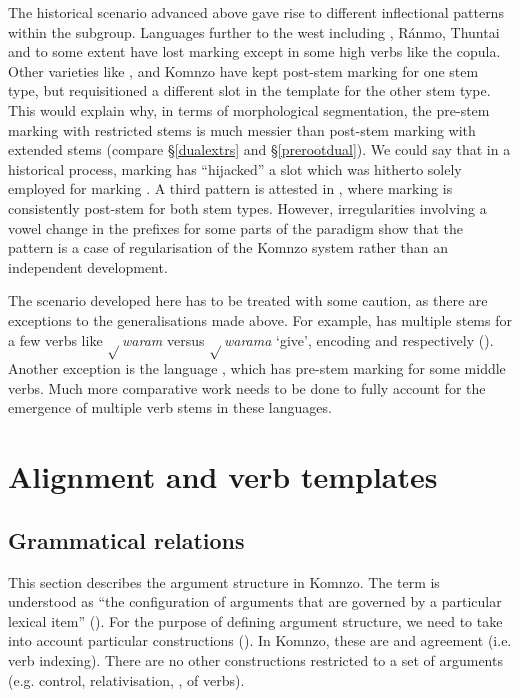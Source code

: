 The historical scenario advanced above gave rise to different inflectional patterns within the  subgroup. Languages further to the west including , Ránmo,  Thuntai and to some extent  have lost  marking except in some high  verbs like the copula. Other varieties like ,  and Komnzo have kept post-stem  marking for one stem type, but requisitioned a different slot in the template for the other stem type. This would explain why, in terms of morphological segmentation, the pre-stem  marking with restricted stems is much messier than post-stem  marking with extended stems (compare \S{}\ref{dualextrs} and \S{}\ref{prerootdual}). We could say that in a historical process,  marking has ``hijacked'' a slot which was hitherto solely employed for marking . A third pattern is attested in , where  marking is consistently post-stem for both stem types. However, irregularities involving a vowel change in the prefixes for some parts of the paradigm show that the  pattern is a case of regularisation of the Komnzo system rather than an independent development.%

The scenario developed here has to be treated with some caution, as there are exceptions to the generalisations made above. For example,  has multiple stems for a few verbs like $\sqrt{}$\emph{waram} versus $\sqrt{}$\emph{warama} `give', encoding  and   respectively (\citealt{Evans:nen}). Another exception is the  language , which has pre-stem  marking for some middle verbs. Much more comparative work needs to be done to fully account for the emergence of multiple verb stems in these languages.

\section{Alignment and verb templates} \label{alignmtemplates}

\subsection{Grammatical relations} \label{grammrel}

This section describes the argument structure in Komnzo. The term is understood as ``the configuration of arguments that are governed by a particular lexical item'' (\citealt[1130]{HaspelmathBardey:2004}). For the purpose of defining argument structure, we need to take into account particular constructions (\citealt[433]{Bickel:2011wo}). In Komnzo, these are  and agreement (i.e. verb indexing). There are no other constructions restricted to a set of arguments (e.g. control, relativisation, ,  of verbs).%

